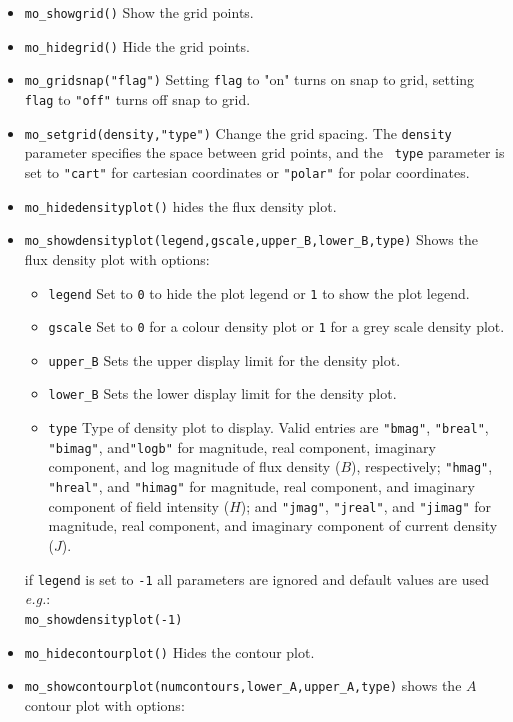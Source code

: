 \begin{itemize}
\item{\verb+mo_showgrid()+} Show the grid points.
\item{\verb+mo_hidegrid()+} Hide the grid points.
\item{\verb+mo_gridsnap("flag")+}
Setting {\tt flag} to "on" turns on snap to grid, setting {\tt
flag} to {\tt "off"} turns off snap to grid.
\item{\verb+mo_setgrid(density,"type")+} Change the grid spacing.  The {\tt density}
parameter specifies the space between grid points, and the {\tt
type} parameter is set to {\tt "cart"} for cartesian coordinates or
{\tt "polar"} for polar coordinates.
\item{\verb+mo_hidedensityplot()+} hides the flux density plot.
\item{\verb+mo_showdensityplot(legend,gscale,upper_B,lower_B,type)+}
Shows the flux density plot with options:
        \begin{itemize}
        \item {\tt legend} Set to {\tt 0} to hide the plot legend or {\tt 1} to show the plot
        legend.
        \item {\tt gscale} Set to {\tt 0} for a colour density plot or {\tt 1} for a grey scale density
        plot.
        \item{\verb+upper_B+} Sets the upper display limit for the density
        plot.
        \item{\verb+lower_B+} Sets the lower display limit for the density
        plot.
        \item{\tt type} Type of density plot to display. Valid
        entries are {\tt "bmag"}, {\tt "breal"},  {\tt "bimag"}, and{\tt "logb"} for
        magnitude, real component,  imaginary component, and log magnitude of flux density ($B$),
        respectively; {\tt "hmag"}, {\tt "hreal"}, and {\tt "himag"} for
        magnitude, real component, and imaginary component of field intensity ($H$);
		and {\tt "jmag"}, {\tt "jreal"}, and {\tt "jimag"} for
        magnitude, real component, and imaginary component of current density ($J$).
        \end{itemize}
        if {\tt legend} is set to {\tt -1} all parameters are ignored and default values are
        used {\em e.g.}: \\ \verb+mo_showdensityplot(-1)+
\item{\verb+mo_hidecontourplot()+} Hides the contour plot.
\item{\verb+mo_showcontourplot(numcontours,lower_A,upper_A,type)+}
shows the $A$ contour plot with options:

\end{itemize}
